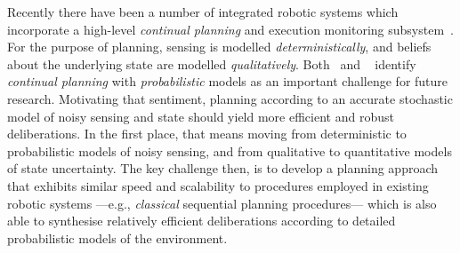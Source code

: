 
















Recently there have been a number of integrated robotic systems which
incorporate a high-level {\em continual planning} and execution
monitoring
subsystem~\cite{wyattetal2010tamd,talamadupula:2010,Kraft2008}.
For the purpose of planning, sensing is modelled {\em
deterministically}, and beliefs about the underlying state are
modelled {\em qualitatively}.
Both~\citeauthor{talamadupula:2010} and
~\citeauthor{wyattetal2010tamd} identify
\emph{continual planning} with {\em probabilistic}
models as an important challenge for future research.
Motivating that sentiment, planning according to an accurate
stochastic model of noisy sensing and state should yield more
efficient and robust deliberations.
In the first place, that means moving from deterministic to
probabilistic models of noisy sensing, and from qualitative to
quantitative models of state uncertainty. The key challenge then, is
to develop a planning approach that exhibits similar speed and
scalability to procedures employed in existing robotic systems
---e.g., {\em classical} sequential planning procedures--- which is
also able to synthesise relatively efficient deliberations according
to detailed probabilistic models of the environment.









